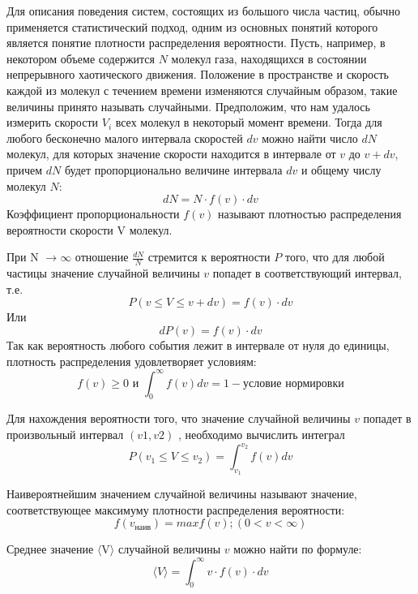 Для описания поведения систем, состоящих из большого числа частиц, обычно применяется 
статистический подход, одним из основных понятий которого является понятие плотности 
распределения вероятности. Пусть, например, в некотором объеме содержится $N$ молекул 
газа, находящихся в состоянии непрерывного хаотического движения. Положение в 
пространстве и скорость каждой из молекул с течением времени изменяются случайным 
образом, такие величины принято называть случайными. Предположим, что нам удалось 
измерить скорости $V_i$ всех молекул в некоторый момент времени. Тогда для любого 
бесконечно малого интервала скоростей $dv$ можно найти число $dN$ молекул, для которых 
значение скорости находится в интервале от $v$ до $v + dv$, причем $dN$ будет пропорционально 
величине интервала $dv$ и общему числу молекул $N$:  
\begin{equation}
    dN = N \cdot f(v) \cdot dv
\end{equation}
Коэффициент пропорциональности $f(v)$ называют плотностью распределения
вероятности скорости V молекул.
\par
При N $\rightarrow \infty $ отношение $\frac{dN}{N}$ стремится к вероятности $P$ того, что для
любой частицы значение случайной величины $v$ попадет в соответствующий
интервал, т.е. 
\begin{equation}
    P(v \leq V \leq v + dv) = f(v) \cdot dv
\end{equation}
Или
\begin{equation}
    dP(v) = f(v) \cdot dv
\end{equation}
Так как вероятность любого события лежит в интервале от нуля до
единицы, плотность распределения удовлетворяет условиям:
\[f(v) \geq 0 \text{ и } \int_{0}^{\infty} f(v)dv = 1 - \text{условие нормировки}\]

\par 
Для нахождения вероятности того, что значение случайной величины $v$
попадет в произвольный интервал $(v1,v2)$ , необходимо вычислить интеграл
\begin{equation}
    P(v_1 \leq V \leq v_2) = \int_{v_1}^{v_2} f(v)dv
\end{equation}

\par 
Наивероятнейшим значением случайной величины называют значение,
соответствующее максимуму плотности распределения вероятности:
\[f(v_\text{наив} ) = max f(v); (0 <  v  < \infty)\]

\par 
Среднее значение $\langle$V$\rangle$ случайной величины $v$ можно найти по формуле:
\begin{equation}
    \langle V \rangle = \int_{0}^{\infty} v \cdot f(v) \cdot dv
\end{equation}

